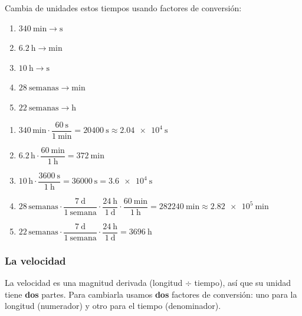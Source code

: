 \begin{exercise}
    Cambia de unidades estos tiempos usando factores de conversión:
    \begin{enumerate}[label=\letraminuscula]
        \item \(\qty{340}{\minute} \to \unit{\s}\)
        \item \(\qty{6.2}{\hour} \to \unit{\minute}\)
        \item \(\qty{10}{\hour} \to \unit{\s}\)
        \item \(\qty{28}{\text{semanas}} \to \unit{\minute}\)
        \item \(\qty{22}{\text{semanas}} \to \unit{\hour}\)
    \end{enumerate}
    \begin{solu}
        \begin{enumerate}[label=\alph*)]
            \item \(\num{340}\,\unit{\minute} \cdot \dfrac{\qty{60}{\s}}{\qty{1}{\minute}} = \qty{20400}{\s} \approx \qty{2.04e4}{\s}\)
            \item \(\num{6.2}\,\unit{\hour} \cdot \dfrac{\qty{60}{\minute}}{\qty{1}{\hour}} = \qty{372}{\minute}\)
            \item \(\num{10}\,\unit{\hour} \cdot \dfrac{\qty{3600}{\s}}{\qty{1}{\hour}} = \qty{36000}{\s} = \qty{3.6e4}{\s}\)
            \item \(\num{28}\,\unit{\text{semanas}} \cdot \dfrac{\qty{7}{\day}}{\qty{1}{\text{semana}}} \cdot \dfrac{\qty{24}{\hour}}{\qty{1}{\day}} \cdot \dfrac{\qty{60}{\minute}}{\qty{1}{\hour}} = \qty{282240}{\minute} \approx \qty{2.82e5}{\minute}\)
            \item \(\num{22}\,\unit{\text{semanas}} \cdot \dfrac{\qty{7}{\day}}{\qty{1}{\text{semana}}} \cdot \dfrac{\qty{24}{\hour}}{\qty{1}{\day}} = \qty{3696}{\hour}\)
        \end{enumerate}
    \end{solu}
\end{exercise}


\subsubsection{La velocidad}

La velocidad es una magnitud derivada (longitud \(\div\) tiempo), así que su unidad tiene \textbf{dos} partes. Para cambiarla usamos \textbf{dos} factores de conversión: uno para la longitud (numerador) y otro para el tiempo (denominador).

